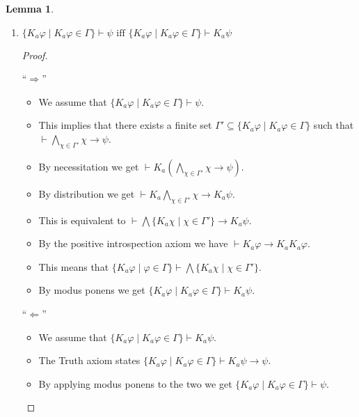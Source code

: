 \documentclass[12pt]{article}
\numberwithin{equation}{section}
\theoremstyle{definition}
\newtheorem{lem}[thm]{Lemma}
\theoremstyle{definition}
\theoremstyle{remark}
\begin{document}
\begin{lem}
\begin{enumerate}
\begin{proof}
\begin{itemize}
    \item By the assumption we get that $K_a\neg K_a\varphi \notin \Gamma$. From axiom 5 (negative introspection) this means that $ \neg K_a\varphi \notin \Gamma$.
    
    \item By item 2 of this lemma we get that $K_a \varphi \in \Gamma$.
    
    \item Therefore $\{ K_a\varphi \mid K_a\varphi \in \Gamma \} = \{ K_a\varphi \mid K_a\varphi \in \Delta \}$ so $\Gamma \sim ^c _a \Delta$.
    \end{itemize}
    \end{proof}
    
    \item $ \{ K_a\varphi \mid K_a\varphi \in \Gamma \} \vdash  \psi \text{ iff } \{ K_a\varphi \mid K_a\varphi \in \Gamma \}\vdash K_a\psi$ 
    
    \begin{proof}
    ~
    
    ``$\Longrightarrow$''
    \begin{itemize}
    \item We assume that $ \{ K_a\varphi \mid K_a\varphi \in \Gamma \} \vdash  \psi$.
    \item This implies that there exists a finite set $ \Gamma' \subseteq \{ K_a\varphi \mid K_a\varphi \in \Gamma \} $ such that $ \vdash \bigwedge\limits _{ \chi \in \Gamma' } \chi\rightarrow \psi$.
    \item By necessitation we get $\vdash K_a ( \bigwedge\limits _{ \chi \in \Gamma' }\chi \rightarrow \psi)$.
    \item By distribution we get $\vdash K_a \bigwedge\limits _{ \chi \in \Gamma' }\chi\rightarrow K_a \psi$.
    \item This is equivalent to $\vdash \bigwedge \{ K_a\chi \mid \chi \in \Gamma' \} \rightarrow K_a \psi$.
    \item By the positive introspection axiom we have $\vdash K_a \varphi \rightarrow K_a K_a\varphi$.
    \item This means that $ \{ K_a\varphi \mid \varphi \in \Gamma \} \vdash \bigwedge \{ K_a \chi \mid \chi \in \Gamma' \}$.
    \item By modus ponens we get $\{ K_a\varphi \mid K_a\varphi \in \Gamma \}\vdash K_a\psi$.
    \end{itemize}
    ``$\Longleftarrow$''
    \begin{itemize}
        \item We assume that $ \{ K_a\varphi \mid K_a\varphi \in \Gamma \} \vdash  K_a\psi$. \item The Truth axiom states $ \{ K_a\varphi \mid K_a\varphi \in \Gamma \} \vdash  K_a\psi \rightarrow \psi$.
        \item By applying modus ponens to the two we get $\{ K_a\varphi \mid K_a\varphi \in \Gamma \}\vdash\psi$.
    \end{itemize}
   

\end{proof}
\end{enumerate}
\end{lem}
\end{document}
